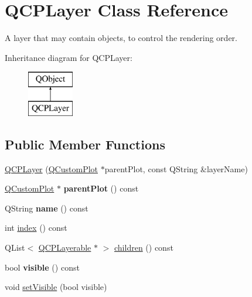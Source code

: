 \hypertarget{classQCPLayer}{}\section{Q\+C\+P\+Layer Class Reference}
\label{classQCPLayer}


A layer that may contain objects, to control the rendering order.  


Inheritance diagram for Q\+C\+P\+Layer\+:\begin{figure}[H]
\begin{center}
\leavevmode
\includegraphics[height=2.000000cm]{classQCPLayer}
\end{center}
\end{figure}
\subsection*{Public Member Functions}
\begin{DoxyCompactItemize}
\item 
\hyperlink{classQCPLayer_a5d0657fc86d624e5efbe930ef21af718}{Q\+C\+P\+Layer} (\hyperlink{classQCustomPlot}{Q\+Custom\+Plot} $\ast$parent\+Plot, const Q\+String \&layer\+Name)
\item 
\hypertarget{classQCPLayer_a3958c9a938c2d05a7378c41484acee08}{}\hyperlink{classQCustomPlot}{Q\+Custom\+Plot} $\ast$ {\bfseries parent\+Plot} () const \label{classQCPLayer_a3958c9a938c2d05a7378c41484acee08}

\item 
\hypertarget{classQCPLayer_a96ebd1e436f3813938cb9cd4a59a60be}{}Q\+String {\bfseries name} () const \label{classQCPLayer_a96ebd1e436f3813938cb9cd4a59a60be}

\item 
int \hyperlink{classQCPLayer_ad5d7010829a6b99f326b07d7e37c8c99}{index} () const 
\item 
Q\+List$<$ \hyperlink{classQCPLayerable}{Q\+C\+P\+Layerable} $\ast$ $>$ \hyperlink{classQCPLayer_a94c2f0100e48cefad2de8fe0fbb03c27}{children} () const 
\item 
\hypertarget{classQCPLayer_a9efca636e4dcad721999a6282f296016}{}bool {\bfseries visible} () const \label{classQCPLayer_a9efca636e4dcad721999a6282f296016}

\item 
void \hyperlink{classQCPLayer_ac07671f74edf6884b51a82afb2c19516}{set\+Visible} (bool visible)
\end{DoxyCompactItemize}

